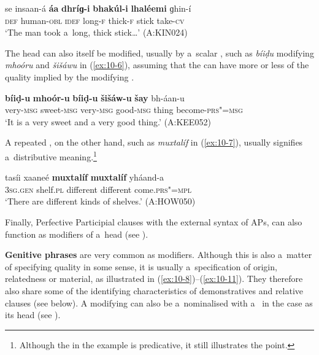 \begin{exe}
\ex
\label{ex:10-5}
\gll se insaan-á \textbf{áa} \textbf{dhríɡ-i} \textbf{bhakúl-i} \textbf{lhaléemi} ɡhin-í \\
\textsc{def} human-\textsc{obl} \textsc{idef} long-\textsc{f} thick-\textsc{f} stick  take-\textsc{cv} \\
\glt `The man took a~long, thick stick{\ldots}' (A:KIN024)
\end{exe}

The  head can also itself be modified, usually by a~scalar , such as \textit{bíiḍu} modifying \textit{mhoóru} and \textit{šišáwu} in (\ref{ex:10-6}), assuming that the  can have more or less of the quality implied by the modifying  . 

\begin{exe}
\ex
\label{ex:10-6}
\gll \textbf{bíiḍ-u} \textbf{mhoór-u} \textbf{bíiḍ-u} \textbf{šišáw-u} \textbf{šay} bh-áan-u\\
very-\textsc{msg} sweet-\textsc{msg} very-\textsc{msg} good-\textsc{msg} thing become-\textsc{prs"=msg} \\
\glt `It is a very sweet and a very good thing.' (A:KEE052)
\end{exe}

A repeated , on the other hand, such as \textit{muxtalíf} in (\ref{ex:10-7}), usually signifies a~distributive meaning.\footnote{Although the   in the example is predicative, it still illustrates the point.}

\begin{exe}
\ex
\label{ex:10-7}
\gll tasíi xaaneé \textbf{muxtalíf} \textbf{muxtalíf} yháand-a \\
\textsc{3sg.gen} shelf.\textsc{pl} different different come.\textsc{prs"=mpl} \\
\glt `There are different kinds of shelves.' (A:HOW050)
\end{exe}

Finally, Perfective Participial clauses with the external syntax of APs, can also function as modifiers of a~head  (see ). 


\textbf{Genitive phrases} are very common as modifiers. Although this is also a~matter of specifying quality in some
sense, it is usually a~specification of origin, relatedness or material, as illustrated in
(\ref{ex:10-8})--(\ref{ex:10-11}). They therefore
also share some of the identifying characteristics of demonstratives and relative clauses (see
below). A modifying   can also be a~nominalised  with a~ in the  case as its head (see ).

